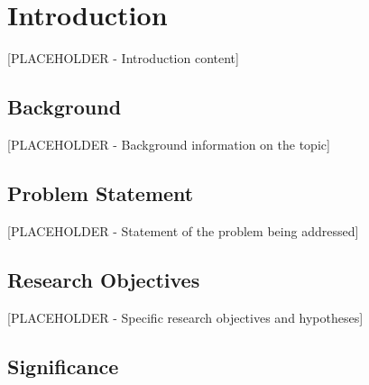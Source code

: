 \documentclass[12pt]{article}
\begin{document}
\newpage

\begin{abstract}
    \textbf{Importance:} [PLACEHOLDER - Why this research matters]
    
    \textbf{Objective:} [PLACEHOLDER - Main research question/objective]
    
    \textbf{Design, Setting, and Participants:} [PLACEHOLDER - Study design, setting, participants]
    
    \textbf{Main Outcomes and Measures:} [PLACEHOLDER - Primary and secondary outcomes]
    
    \textbf{Results:} [PLACEHOLDER - Key findings with statistics]
    
    \textbf{Conclusions and Relevance:} [PLACEHOLDER - Main conclusions and clinical relevance]
    
    \textbf{Keywords:} [PLACEHOLDER]
\end{abstract}

\newpage


\section{Introduction}

[PLACEHOLDER - Introduction content]

\subsection{Background}

[PLACEHOLDER - Background information on the topic]

\subsection{Problem Statement}

[PLACEHOLDER - Statement of the problem being addressed]

\subsection{Research Objectives}

[PLACEHOLDER - Specific research objectives and hypotheses]

\subsection{Significance}
\end{document}
